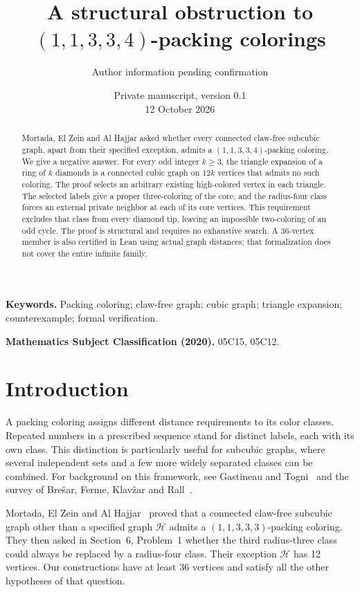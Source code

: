 \documentclass[11pt,a4paper]{article}
\title{A structural obstruction to\texorpdfstring{\\}{}\((1,1,3,3,4)\)-packing colorings}
\author{Author information pending confirmation}
\date{Private manuscript, version 0.1\\12 October 2026}
\theoremstyle{definition}
\theoremstyle{remark}
\newcommand{\palette}{(1,1,3,3,4)}
\newcommand{\weakpalette}{(1,1,3,3,3)}
\begin{document}
\maketitle

\begin{abstract}
Mortada, El Zein and Al Hajjar asked whether every connected claw-free
subcubic graph, apart from their specified exception, admits a
\(\palette\)-packing coloring. We give a negative answer. For every odd
integer \(k\geq3\), the triangle expansion of a ring of \(k\) diamonds is
a connected cubic graph on \(12k\) vertices that admits no such coloring.
The proof selects an arbitrary existing high-colored vertex in each
triangle. The selected labels give a proper three-coloring of the core,
and the radius-four class forces an external private neighbor at each
of its core vertices. This requirement excludes that class from every
diamond tip, leaving an impossible two-coloring of an odd cycle.
The proof is structural and requires no exhaustive search. A 36-vertex
member is also certified in Lean using actual graph distances; that
formalization does not cover the entire infinite family.
\end{abstract}

\noindent\textbf{Keywords.} Packing coloring; claw-free graph; cubic graph;
triangle expansion; counterexample; formal verification.\par
\noindent\textbf{Mathematics Subject Classification (2020).}
05C15, 05C12.

\section{Introduction}

A packing coloring assigns different distance requirements to its
color classes. Repeated numbers in a prescribed sequence stand for
distinct labels, each with its own class. This distinction is
particularly useful for subcubic graphs, where several independent
sets and a few more widely separated classes can be combined.
For background on this framework, see Gastineau and Togni~\cite{GT}
and the survey of Bre\v{s}ar, Ferme, Klav\v{z}ar and Rall~\cite{survey}.

Mortada, El Zein and Al Hajjar~\cite{MEAH} proved that a connected
claw-free subcubic graph other than a specified graph \(\mathcal H\)
admits a \(\weakpalette\)-packing coloring. They then asked in
Section~6, Problem~1 whether the third radius-three class could always
be replaced by a radius-four class. Their exception \(\mathcal H\)
has 12 vertices. Our constructions have at least 36 vertices and
satisfy all the other hypotheses of that question.
\end{document}
